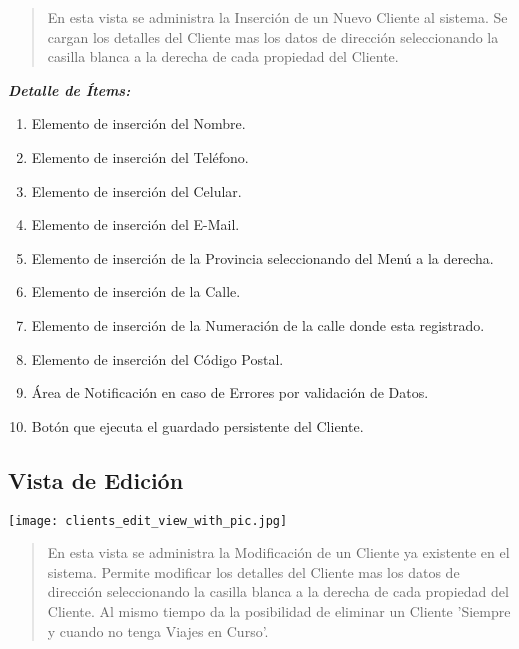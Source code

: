 \documentclass[
10pt, %
a4paper, %
oneside, %
headinclude,footinclude, %
BCOR5mm, %
]{scrartcl}
\begin{document}
 \begin{quotation}
    En esta vista se administra la Inserci\'on de un Nuevo Cliente al sistema.
    Se cargan los detalles del Cliente mas los datos de direcci\'on seleccionando
    la casilla blanca a la derecha de cada propiedad del Cliente.
 \end{quotation}

\pagebreak

 \textbf{ \emph{Detalle de \'Items:} }
 \begin{enumerate}
   \item  Elemento de inserci\'on del Nombre.
   \item  Elemento de inserci\'on del Tel\'efono.
   \item  Elemento de inserci\'on del Celular.
   \item  Elemento de inserci\'on del E-Mail.
   \item  Elemento de inserci\'on de la Provincia seleccionando
      del Men\'u a la derecha.
   \item  Elemento de inserci\'on de la Calle.
   \item  Elemento de inserci\'on de la Numeraci\'on de la calle donde esta registrado.
   \item  Elemento de inserci\'on del C\'odigo Postal.
   \item  \'Area de Notificaci\'on en caso de Errores por validaci\'on de Datos.
   \item  Bot\'on que ejecuta el guardado persistente del Cliente.
  \end{enumerate}

\subsection{Vista de Edici\'on}
 \begin{flushleft}
     \texttt{[image: clients\_edit\_view\_with\_pic.jpg]}
 \end{flushleft}

 \begin{quotation}
    En esta vista se administra la Modificaci\'on de un Cliente ya existente
    en el sistema. Permite modificar los detalles del Cliente mas los
    datos de direcci\'on seleccionando la casilla blanca a la derecha de cada
    propiedad del Cliente.
    Al mismo tiempo da la posibilidad de eliminar un Cliente 'Siempre y cuando
    no tenga Viajes en Curso'.
 \end{quotation}
\end{document}
